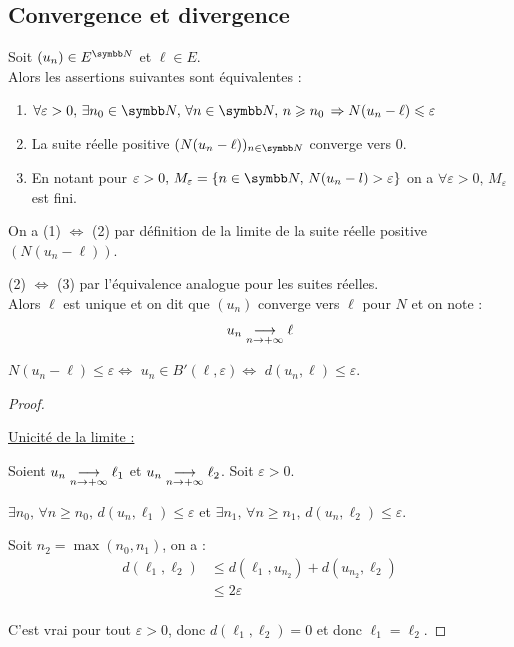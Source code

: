 \subsection{Convergence et divergence}
\begin{definition}{}{}
    Soit $(u_n) \in E^{\N}$ et $\ell \in E$. \\

    Alors les assertions suivantes sont équivalentes : 
    \begin{enumerate}
        \item $\forall \varepsilon > 0, \, \exists n_0 \in \N, \, \forall n \in \N, \, n \geqslant n_0 \, \Rightarrow N(u_n - \ell) \leqslant \varepsilon$
        \item La suite réelle positive $(N(u_n - \ell))_{n \in \N}$ converge vers 0.
        \item En notant pour $\varepsilon > 0, \, M_\varepsilon = \{n \in \N, \, N(u_n - l) > \varepsilon\}$ on a
            $\forall \varepsilon > 0, \, M_\varepsilon$ est fini. \\
    \end{enumerate}

    On a (1) $\iff$ (2) par définition de la limite de la suite réelle positive $(N(u_n - \ell))$.

    (2) $\iff$ (3) par l'équivalence analogue pour les suites réelles.\\

    Alors $\ell$ est unique et on dit que $(u_n)$ converge vers $\ell$ pour $N$ et on note :
    \[u_n \underset{n \to +\infty}{\longrightarrow} \ell\]
\end{definition}

\begin{remarque}
    $N(u_n - \ell) \leqslant \varepsilon \iff$ $u_n \in B'(\ell, \varepsilon) \iff$ $d(u_n, \ell) \leqslant \varepsilon$.
\end{remarque}


\begin{proof}~

    \uline{Unicité de la limite :}

    \avspace Soient $u_n \underset{n \to +\infty}{\longrightarrow} \ell_1$ et $u_n \underset{n \to +\infty}{\longrightarrow} \ell_2$.
    Soit $\varepsilon > 0$. 

    $\exists n_0, \, \forall n \geqslant n_0, \, d(u_n, \ell_1) \leqslant \varepsilon$ et
    $\exists n_1, \, \forall n \geqslant n_1, \, d(u_n, \ell_2) \leqslant \varepsilon$.

    Soit $n_2 = \max(n_0, n_1)$, on a :
    \begin{align*}
        d(\ell_1, \ell_2) & \leqslant d(\ell_1, u_{n_2}) + d(u_{n_2}, \ell_2) \\
        &\leqslant 2\varepsilon \\
    \end{align*}

    C'est vrai pour tout $\varepsilon > 0$, donc $d(\ell_1, \ell_2) = 0$ et donc $\ell_1 = \ell_2$.
\end{proof}

